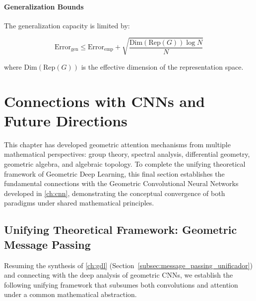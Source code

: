 \paragraph{Generalization Bounds}

The generalization capacity is limited by:

\begin{equation}
\text{Error}_{\text{gen}} \leq \text{Error}_{\text{emp}} + \sqrt{\frac{\text{Dim}(\text{Rep}(G)) \log N}{N}}
\label{eq:geometric_generalization_bound}
\end{equation}

where $\text{Dim}(\text{Rep}(G))$ is the effective dimension of the representation space.

\section{Connections with CNNs and Future Directions}\label{sec:cnn_attention_connections}

This chapter has developed geometric attention mechanisms from multiple mathematical perspectives: group theory, spectral analysis, differential geometry, geometric algebra, and algebraic topology. To complete the unifying theoretical framework of Geometric Deep Learning, this final section establishes the fundamental connections with the Geometric Convolutional Neural Networks developed in \autoref{ch:cnn}, demonstrating the conceptual convergence of both paradigms under shared mathematical principles.

\subsection{Unifying Theoretical Framework: Geometric Message Passing}\label{subsec:marco_teorico_unificador}

Resuming the synthesis of \autoref{ch:gdl} (Section~\ref{subsec:message_passing_unificador}) and connecting with the deep analysis of geometric CNNs, we establish the following unifying framework that subsumes both convolutions and attention under a common mathematical abstraction.

